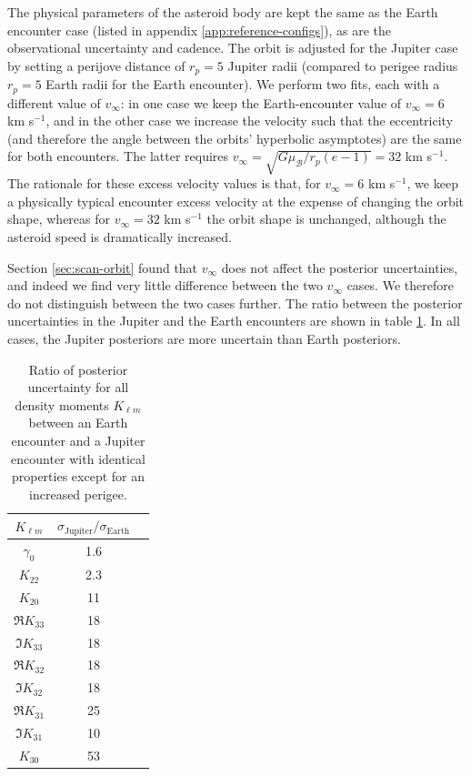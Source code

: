 \documentclass[fleqn,usenatbib]{mnras}
\begin{document}
The physical parameters of the asteroid body are kept the same as the Earth encounter case (listed in appendix \ref{app:reference-configs}), as are the observational uncertainty and cadence. The orbit is adjusted for the Jupiter case by setting a perijove distance of $r_p=5$ Jupiter radii (compared to perigee radius $r_p=5$ Earth radii for the Earth encounter). We perform two fits, each with a different value of $v_\infty$: in one case we keep the Earth-encounter value of $v_\infty = 6$ km s$^{-1}$, and in the other case we increase the velocity such that the eccentricity (and therefore the angle between the orbits' hyperbolic asymptotes) are the same for both encounters. The latter requires $v_\infty = \sqrt{G\mu_\mathcal{B}/r_p (e-1)}=32$ km s$^{-1}$. The rationale for these excess velocity values is that, for $v_\infty = 6$ km s$^{-1}$, we keep a physically typical encounter excess velocity at the expense of changing the orbit shape, whereas for $v_\infty =32$ km s$^{-1}$ the orbit shape is unchanged, although the asteroid speed is dramatically increased.

Section \ref{sec:scan-orbit} found that $v_\infty$ does not affect the posterior uncertainties, and indeed we find very little difference between the two $v_\infty$ cases. We therefore do not distinguish between the two cases further. The ratio between the posterior uncertainties in the Jupiter and the Earth encounters are shown in table \ref{tab:jupiter-uncertainty}. In all cases, the Jupiter posteriors are more uncertain than Earth posteriors.

\begin{table}
  \centering
  \begin{tabular}{c|cc}
    \hline 
    $K_{\ell m}$ & $\sigma_\text{Jupiter}/\sigma_\text{Earth}$\\ \hline 
    $\gamma_0$ & 1.6 \\
    $K_{22}$ & 2.3 \\
    $K_{20}$ & 11 \\
    $\Re K_{33}$ & 18 \\
    $\Im K_{33}$ & 18 \\
    $\Re K_{32}$ & 18 \\
    $\Im K_{32}$ & 18 \\
    $\Re K_{31}$ & 25 \\
    $\Im K_{31}$ & 10 \\
    $K_{30}$ & 53 \\ \hline
  \end{tabular}
  \caption{Ratio of posterior uncertainty for all density moments $K_{\ell m}$ between an Earth encounter and a Jupiter encounter with identical properties except for an increased perigee.}
  \label{tab:jupiter-uncertainty}
\end{table}
\end{document}

